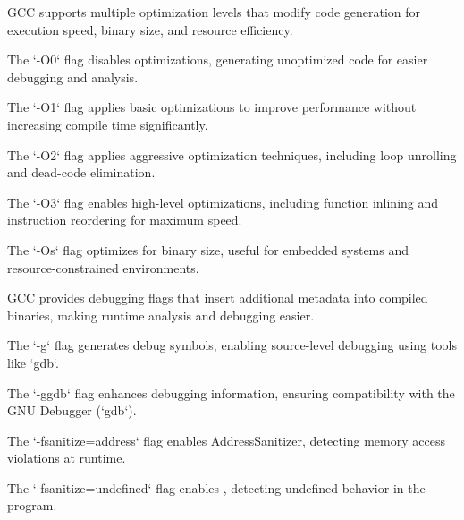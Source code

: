 \begin{NxSSSSBox}
	\begin{NxIDBox}
		GCC supports multiple optimization levels that modify code generation for execution speed, binary size, and resource efficiency.
	\end{NxIDBox}
	\begin{NxIDBox}
		The `-O0` flag disables optimizations, generating unoptimized code for easier debugging and analysis.
	\end{NxIDBox}
	\begin{NxIDBox}
		The `-O1` flag applies basic optimizations to improve performance without increasing compile time significantly.
	\end{NxIDBox}
	\begin{NxIDBox}
		The `-O2` flag applies aggressive optimization techniques, including loop unrolling and dead-code elimination.
	\end{NxIDBox}
	\begin{NxIDBox}
		The `-O3` flag enables high-level optimizations, including function inlining and instruction reordering for maximum speed.
	\end{NxIDBox}
	\begin{NxIDBox}
		The `-Os` flag optimizes for binary size, useful for embedded systems and resource-constrained environments.
	\end{NxIDBox}
\end{NxSSSSBox}

\begin{NxSSSSBox}
	\begin{NxIDBox}
		GCC provides debugging flags that insert additional metadata into compiled binaries, making runtime analysis and debugging easier.
	\end{NxIDBox}
	\begin{NxIDBox}
		The `-g` flag generates debug symbols, enabling source-level debugging using tools like `gdb`.
	\end{NxIDBox}
	\begin{NxIDBox}
		The `-ggdb` flag enhances debugging information, ensuring compatibility with the GNU Debugger (`gdb`).
	\end{NxIDBox}
	\begin{NxIDBox}
		The `-fsanitize=address` flag enables AddressSanitizer, detecting memory access violations at runtime.
	\end{NxIDBox}
	\begin{NxIDBox}
		The `-fsanitize=undefined` flag enables , detecting undefined behavior in the program.
	\end{NxIDBox}
\end{NxSSSSBox}

